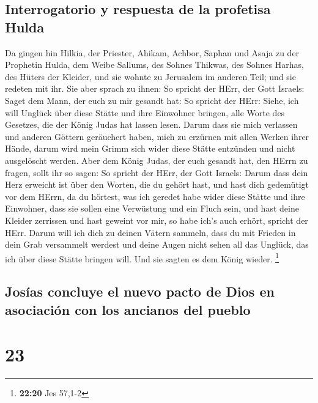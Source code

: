 \hypertarget{interrogatorio-y-respuesta-de-la-profetisa-hulda}{%
\subsection{Interrogatorio y respuesta de la profetisa
Hulda}\label{interrogatorio-y-respuesta-de-la-profetisa-hulda}}

 Da gingen hin Hilkia, der Priester, Ahikam, Achbor,
Saphan und Asaja zu der Prophetin Hulda, dem Weibe Sallums, des Sohnes
Thikwas, des Sohnes Harhas, des Hüters der Kleider, und sie wohnte zu
Jerusalem im anderen Teil; und sie redeten mit ihr.  Sie
aber sprach zu ihnen: So spricht der HErr, der Gott Israels: Saget dem
Mann, der euch zu mir gesandt hat:  So spricht der HErr:
Siehe, ich will Unglück über diese Stätte und ihre Einwohner bringen,
alle Worte des Gesetzes, die der König Judas hat lassen lesen.
 Darum dass sie mich verlassen und anderen Göttern
geräuchert haben, mich zu erzürnen mit allen Werken ihrer Hände, darum
wird mein Grimm sich wider diese Stätte entzünden und nicht ausgelöscht
werden.  Aber dem König Judas, der euch gesandt hat, den
HErrn zu fragen, sollt ihr so sagen: So spricht der HErr, der Gott
Israels:  Darum dass dein Herz erweicht ist über den
Worten, die du gehört hast, und hast dich gedemütigt vor dem HErrn, da
du hörtest, was ich geredet habe wider diese Stätte und ihre Einwohner,
dass sie sollen eine Verwüstung und ein Fluch sein, und hast deine
Kleider zerrissen und hast geweint vor mir, so habe ich's auch erhört,
spricht der HErr.  Darum will ich dich zu deinen Vätern
sammeln, dass du mit Frieden in dein Grab versammelt werdest und deine
Augen nicht sehen all das Unglück, das ich über diese Stätte bringen
will. Und sie sagten es dem König wieder. \footnote{\textbf{22:20} Jes
  57,1-2}

\hypertarget{josuxedas-concluye-el-nuevo-pacto-de-dios-en-asociaciuxf3n-con-los-ancianos-del-pueblo}{%
\subsection{Josías concluye el nuevo pacto de Dios en asociación con los
ancianos del
pueblo}\label{josuxedas-concluye-el-nuevo-pacto-de-dios-en-asociaciuxf3n-con-los-ancianos-del-pueblo}}

\hypertarget{section-22}{%
\section{23}\label{section-22}}

